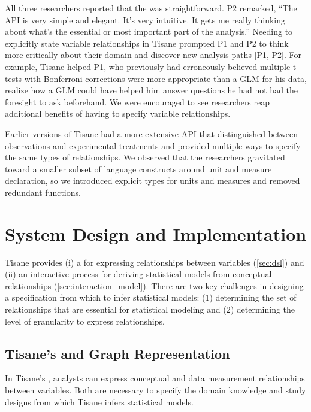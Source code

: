 All three researchers reported that the \SDSLlong %
was straightforward. P2 remarked, ``The API is very simple and elegant. It's
very intuitive. It gets me really thinking about what's the essential or most
important part of the analysis.'' Needing to explicitly state variable
relationships in Tisane prompted P1 and P2 to think more critically about their
domain and discover new analysis paths [P1, P2]. For example, Tisane helped
P1, who previously had erroneously believed multiple t-tests with Bonferroni
corrections were more appropriate than a GLM for his data, realize how a GLM
could have helped him answer questions he had not had the foresight to ask
beforehand. %
We were encouraged to see researchers reap additional benefits of having to
specify variable relationships.

Earlier versions of Tisane had a more extensive API that distinguished between
observations and experimental treatments and provided multiple ways to specify
the same types of relationships. We observed that the researchers gravitated
toward a smaller subset of language constructs around unit and measure
declaration, so we introduced explicit types for units and measures and removed
redundant functions.

\tableStudyDesignTools

\section{System Design and Implementation} \label{sec:tisane}

Tisane provides (i) a \SDSLlong for expressing relationships between variables
(\autoref{sec:dsl}) and (ii) an interactive process for deriving
statistical models from conceptual relationships (\autoref{sec:interaction_model}). There are two key challenges
in designing a specification from which to infer statistical models: (1)
determining the set of relationships that are essential for statistical modeling
and (2) determining the level of granularity to express relationships.

\subsection{Tisane's \SDSL and Graph Representation} \label{sec:dsl}
In Tisane's \SDSL, analysts can express conceptual and data measurement
relationships between variables. Both are necessary to specify the domain
knowledge and study designs from which Tisane infers statistical models.

